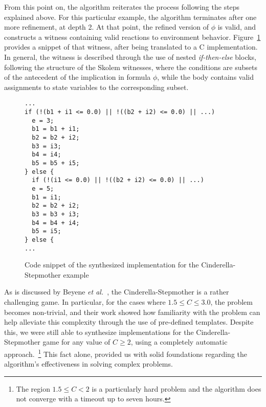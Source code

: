 From this point on, the algorithm reiterates the process following the steps
explained above. For this particular example, the algorithm terminates after one
more refinement, at depth 2. At that point, the refined version of
$\phi$ is valid, and \aeval constructs a witness containing valid reactions to
environment behavior. Figure~\ref{fg:witness} provides a snippet of
that witness, after being translated to a C implementation. 
In general, the witness is described through the use of nested \textit{if-then-else} blocks, following the structure of the Skolem witnesses, where the conditions are subsets of the antecedent of
the implication in formula $\phi$, while the body contains valid assignments to
state variables to the corresponding subset.


\begin{figure}[!t]
\centering
 \begin{Verbatim}[fontsize=\footnotesize]
...
if (!(b1 + i1 <= 0.0) || !((b2 + i2) <= 0.0) || ...)
  e = 3;
  b1 = b1 + i1;
  b2 = b2 + i2;
  b3 = i3;
  b4 = i4;
  b5 = b5 + i5;
} else {
  if (!(i1 <= 0.0) || !((b2 + i2) <= 0.0) || ...)
  e = 5;
  b1 = i1;
  b2 = b2 + i2;
  b3 = b3 + i3;
  b4 = b4 + i4;
  b5 = i5;
} else {
...
 \end{Verbatim}
\caption{Code snippet of the synthesized implementation for the Cinderella-Stepmother
example}
\label{fg:witness}
\end{figure}

As is discussed by Beyene \textit{et al.}~\cite{beyene2014constraint}, the
Cinderella-Stepmother is a rather challenging game. In particular, for the
cases where $1.5 \leq C \leq 3.0$, the problem becomes non-trivial, and their
work showed how familiarity with the problem can help alleviate this complexity
through the use of pre-defined templates. Despite this, we were still
able to synthesize implementations for the Cinderella-Stepmother game for any
value of $C \geq 2$, using a completely automatic approach.~\footnote{The region $1.5\leq C < 2$ is a particularly hard problem and the algorithm does not converge with a timeout up to seven hours.} This fact alone,
provided us with solid foundations regarding the algorithm's effectiveness in
solving complex problems.
